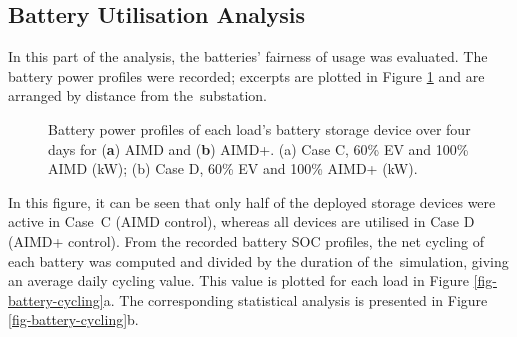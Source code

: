 \subsection{Battery Utilisation Analysis}

In this part of the analysis, the batteries' fairness of usage was evaluated. The battery power profiles were recorded; excerpts are plotted in Figure \ref{fig-battery-utilisation-power} and are arranged by distance from the~substation.\vspace{-12pt}


\begin{figure}\centering
 \vspace{-3pt}
 \caption{Battery power profiles of each load's battery storage device over four days for (\textbf{a}) AIMD  and (\textbf{b}) AIMD+. ({a}) Case {C}, 60\% EV and 100\% AIMD (kW); ({b}) Case {D}, 60\% EV and 100\% AIMD+ (kW).}
 \label{fig-battery-utilisation-power}
\end{figure}

In this figure, it can be seen that only half of the deployed storage devices were active in Case~{C} (AIMD control), whereas all devices are utilised in Case {D} (AIMD+ control). From the recorded battery SOC profiles, the net cycling of each battery was computed and divided by the duration of the~simulation, giving an average daily cycling value. This value is plotted for each load in Figure \ref{fig-battery-cycling}a. The corresponding statistical analysis is presented in Figure \ref{fig-battery-cycling}b.\vspace{-6pt}


